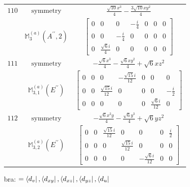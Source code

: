 \documentclass[fleqn,8pt,landscape]{jsarticle}
\begin{document}
\begin{longtable}{ccc}
$ 110 $ & $ \text{symmetry} $ & $ \frac{\sqrt{10} x^{3}}{4} - \frac{3 \sqrt{10} x y^{2}}{4} $ \\
$  $ & $ \mathbb{M}_{3}^{(a)}(A^{\prime\prime},2) $ & $ \begin{bmatrix} 0 & 0 & 0 & - \frac{i}{4} & 0 & 0 & 0 \\ 0 & 0 & - \frac{i}{4} & 0 & 0 & 0 & 0 \\ 0 & \frac{\sqrt{6} i}{4} & 0 & 0 & 0 & 0 & 0 \end{bmatrix} $ \\ \hline
$ 111 $ & $ \text{symmetry} $ & $ - \frac{\sqrt{6} x^{3}}{4} - \frac{\sqrt{6} x y^{2}}{4} + \sqrt{6} x z^{2} $ \\
$  $ & $ \mathbb{M}_{3,1}^{(a)}(E^{\prime\prime}) $ & $ \begin{bmatrix} 0 & 0 & 0 & - \frac{\sqrt{15} i}{12} & 0 & 0 & 0 \\ 0 & 0 & \frac{\sqrt{15} i}{12} & 0 & 0 & 0 & - \frac{i}{2} \\ 0 & 0 & 0 & 0 & 0 & \frac{\sqrt{6} i}{12} & 0 \end{bmatrix} $ \\ \hline
$ 112 $ & $ \text{symmetry} $ & $ - \frac{\sqrt{6} x^{2} y}{4} - \frac{\sqrt{6} y^{3}}{4} + \sqrt{6} y z^{2} $ \\
$  $ & $ \mathbb{M}_{3,2}^{(a)}(E^{\prime\prime}) $ & $ \begin{bmatrix} 0 & 0 & \frac{\sqrt{15} i}{12} & 0 & 0 & 0 & \frac{i}{2} \\ 0 & 0 & 0 & \frac{\sqrt{15} i}{12} & 0 & 0 & 0 \\ 0 & 0 & 0 & 0 & - \frac{\sqrt{6} i}{12} & 0 & 0 \end{bmatrix} $ \\ \hline
\end{longtable}
bra: $=\bra{d_{v}}, \bra{d_{xy}}, \bra{d_{xz}}, \bra{d_{yz}}, \bra{d_{u}}$
\end{document}
